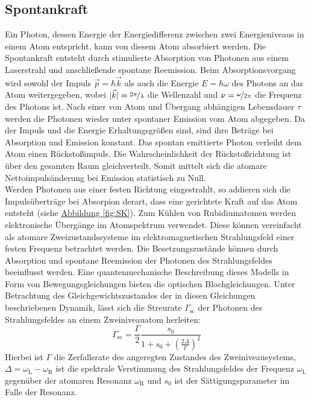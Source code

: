 \documentclass[
class=book,
accentcolor=1b,
custommargins=geometry,
fontsize=11pt,
thesis={type=Versuchsanleitung},
ruledheaders=all,
headline=false,
instbox=false,
marginpar=false,
title=small,
ignore-missing-data=true,
twoside=false,
logofile=apqdesign/tuda_logo.pdf,
pdfa=false %
]{apqpub}
\begin{document}
				\subsection{Spontankraft}\label{ssec:SK}		
				Ein Photon, dessen Energie der Energiedifferenz zwischen zwei Energieniveaus in einem Atom entspricht, kann von diesem Atom absorbiert werden. 
				Die Spontankraft entsteht durch stimulierte Absorption von Photonen aus einem Laserstrahl und anschließende spontane Reemission. 
				Beim Absorptionsvorgang wird sowohl der Impuls $\vec{p} = \hbar \vec{k}$ als auch die Energie $E = \hbar \omega$ des Photons an das Atom weitergegeben, wobei $\vert \vec{k} \vert = \nicefrac{2\pi}{\lambda}$ die Wellenzahl und $\nu = \nicefrac{\omega}{2\pi}$ die Frequenz des Photons ist. 
				Nach einer von Atom und Übergang abhängigen Lebensdauer $\tau$ werden die Photonen wieder unter spontaner Emission vom Atom abgegeben. 
				Da der Impuls und die Energie Erhaltungsgrößen sind, sind ihre Beträge bei Absorption und Emission konstant. 
				Das spontan emittierte Photon verleiht dem Atom einen Rückstoßimpuls. 
				Die Wahrscheinlichkeit der Rückstoßrichtung ist über den gesamten Raum gleichverteilt. 
				Somit mittelt sich die atomare Nettoimpulsänderung bei Emission statistisch zu Null.\\ 
				Werden Photonen aus einer festen Richtung eingestrahlt, so addieren sich die Impulsüberträge bei Absorpion derart, dass eine gerichtete Kraft auf das Atom entsteht (siehe \hyperref[fig:SK]{Abbildung \ref{fig:SK}}).
				Zum Kühlen von Rubidiumatomen werden elektronische Übergänge im Atomspektrum verwendet. 
				Diese können vereinfacht als atomare Zweizustandssysteme im elektromagnetischen Strahlungsfeld einer festen Frequenz betrachtet werden. 
				Die Besetzungszustände können durch Absorption und spontane Reemission der Photonen des	Strahlungsfeldes beeinflusst werden. 
				Eine quantenmechanische Beschreibung dieses Modells in Form von Bewegungsgleichungen bieten die optischen Blochgleichungen. 
				Unter Betrachtung des Gleichgewichtszustandes der in diesen Gleichungen beschriebenen Dynamik, lässt sich die Streurate $\varGamma_{\text{sc}}$ der Photonen des Strahlungsfeldes an einem Zweiniveauatom herleiten:			
				\begin{equation}\label{equa:6-1}
				\Gamma_{\text{sc}} = \frac{\Gamma}{2} \frac{s_0}{1+s_0+\left(\frac{2\Delta}{\Gamma}\right)^2}
				\end{equation}				
				Hierbei ist $\Gamma$ die Zerfallsrate des angeregten Zustandes des Zweiniveausystems, $\Delta = \omega_{\text{L}} - \omega_{\text{R}} $ ist die spektrale Verstimmung des Strahlungsfeldes der Frequenz $\omega_{\text{L}}$ gegenüber der atomaren Resonanz $\omega_{\text{R}}$ und $s_0$ ist der Sättigungsparameter im Falle der Resonanz. 
\end{document}
